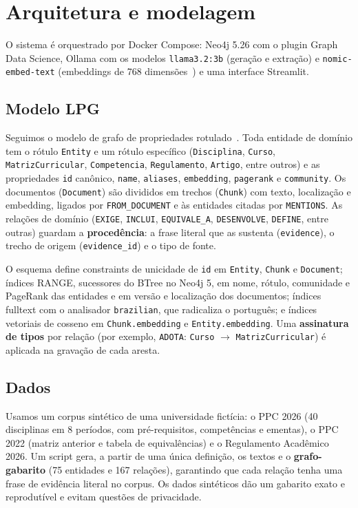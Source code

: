 \documentclass[12pt]{article}
\begin{document}
\section{Arquitetura e modelagem}

O sistema é orquestrado por Docker Compose: Neo4j 5.26 com o plugin Graph Data Science,
Ollama com os modelos \texttt{llama3.2:3b} (geração e extração) e \texttt{nomic-embed-text}
(embeddings de 768 dimensões~\cite{nussbaum2024nomic}) e uma interface Streamlit.

\subsection{Modelo LPG}

Seguimos o modelo de grafo de propriedades rotulado~\cite{robinson2015graphdb}. Toda
entidade de domínio tem o rótulo \texttt{Entity} e um rótulo específico
(\texttt{Disciplina}, \texttt{Curso}, \texttt{MatrizCurricular}, \texttt{Competencia},
\texttt{Regulamento}, \texttt{Artigo}, entre outros) e as propriedades \texttt{id}
canônico, \texttt{name}, \texttt{aliases}, \texttt{embedding}, \texttt{pagerank} e
\texttt{community}. Os documentos (\texttt{Document}) são divididos em trechos
(\texttt{Chunk}) com texto, localização e embedding, ligados por \texttt{FROM\_DOCUMENT}
e às entidades citadas por \texttt{MENTIONS}. As relações de domínio (\texttt{EXIGE},
\texttt{INCLUI}, \texttt{EQUIVALE\_A}, \texttt{DESENVOLVE}, \texttt{DEFINE}, entre
outras) guardam a \textbf{procedência}: a frase literal que as sustenta
(\texttt{evidence}), o trecho de origem (\texttt{evidence\_id}) e o tipo de fonte.

O esquema define constraints de unicidade de \texttt{id} em \texttt{Entity},
\texttt{Chunk} e \texttt{Document}; índices RANGE, sucessores do BTree no Neo4j 5, em
nome, rótulo, comunidade e PageRank das entidades e em versão e localização dos
documentos; índices fulltext com o analisador \texttt{brazilian}, que radicaliza o
português; e índices vetoriais de cosseno em \texttt{Chunk.embedding} e
\texttt{Entity.embedding}. Uma \textbf{assinatura de tipos} por relação (por exemplo,
\texttt{ADOTA}: \texttt{Curso} $\rightarrow$ \texttt{MatrizCurricular}) é aplicada na
gravação de cada aresta.

\subsection{Dados}

Usamos um corpus sintético de uma universidade fictícia: o PPC 2026 (40 disciplinas
em 8 períodos, com pré-requisitos, competências e ementas), o PPC 2022 (matriz anterior e
tabela de equivalências) e o Regulamento Acadêmico 2026. Um script gera, a partir de uma
única definição, os textos e o \textbf{grafo-gabarito} (75 entidades e 167 relações),
garantindo que cada relação tenha uma frase de evidência literal no corpus. Os dados
sintéticos dão um gabarito exato e reprodutível e evitam questões de privacidade.
\end{document}
